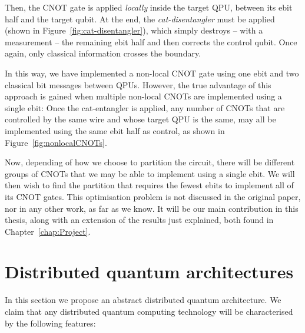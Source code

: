 

Then, the CNOT gate is applied \textit{locally} inside the target QPU, between its ebit half and the target qubit. At the end, the \textit{cat-disentangler} must be applied (shown in Figure~\ref{fig:cat-disentangler}), which simply destroys -- with a measurement -- the remaining ebit half and then corrects the control qubit. Once again, only classical information crosses the boundary.



In this way, we have implemented a non-local CNOT gate using one ebit and two classical bit messages between QPUs. However, the true advantage of this approach is gained when multiple non-local CNOTs are implemented using a single ebit: Once the cat-entangler is applied, any number of CNOTs that are controlled by the same wire and whose target QPU is the same, may all be implemented using the same ebit half as control, as shown in Figure~\ref{fig:nonlocalCNOTs}.



Now, depending of how we choose to partition the circuit, there will be different groups of CNOTs that we may be able to implement using a single ebit. We will then wish to find the partition that requires the fewest ebits to implement all of its CNOT gates. This optimisation problem is not discussed in the original paper, nor in any other work, as far as we know. It will be our main contribution in this thesis, along with an extension of the results just explained, both found in Chapter~\ref{chap:Project}.


\section{Distributed quantum architectures}
\label{DQC_Architecture} 

In this section we propose an abstract distributed quantum architecture. We claim that any distributed quantum computing technology will be characterised by the following features:

